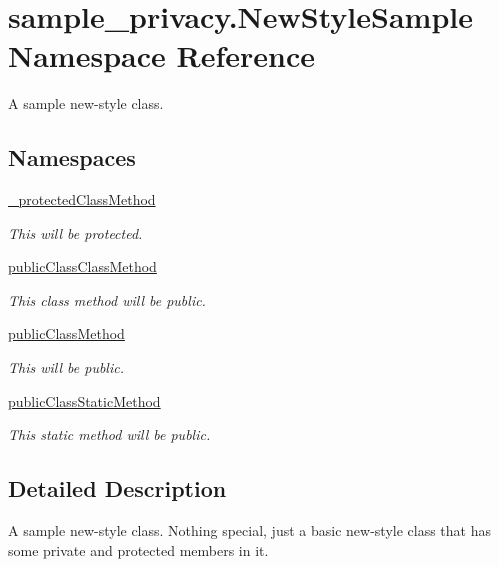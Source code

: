 \hypertarget{namespacesample__privacy_1_1_new_style_sample}{\section{sample\-\_\-privacy.\-New\-Style\-Sample Namespace Reference}
\label{namespacesample__privacy_1_1_new_style_sample}
}


A sample new-\/style class.  


\subsection*{Namespaces}
\begin{DoxyCompactItemize}
\item 
\hyperlink{namespacesample__privacy_1_1_new_style_sample_1_1__protected_class_method}{\-\_\-protected\-Class\-Method}
\begin{DoxyCompactList}\small\item\em This will be protected. \end{DoxyCompactList}\item 
\hyperlink{namespacesample__privacy_1_1_new_style_sample_1_1public_class_class_method}{public\-Class\-Class\-Method}
\begin{DoxyCompactList}\small\item\em This class method will be public. \end{DoxyCompactList}\item 
\hyperlink{namespacesample__privacy_1_1_new_style_sample_1_1public_class_method}{public\-Class\-Method}
\begin{DoxyCompactList}\small\item\em This will be public. \end{DoxyCompactList}\item 
\hyperlink{namespacesample__privacy_1_1_new_style_sample_1_1public_class_static_method}{public\-Class\-Static\-Method}
\begin{DoxyCompactList}\small\item\em This static method will be public. \end{DoxyCompactList}\end{DoxyCompactItemize}


\subsection{Detailed Description}
A sample new-\/style class. Nothing special, just a basic new-\/style class that has some private and protected members in it. 